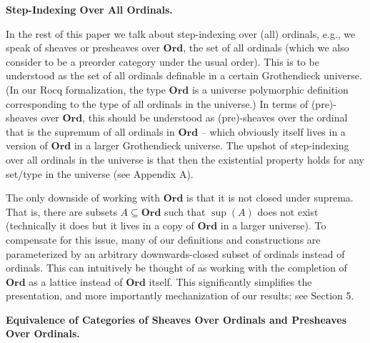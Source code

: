 \documentclass[10pt,a4paper]{article}
\begin{document}
 
 
 
\par\medskip\noindent\textbf{Step-Indexing Over All Ordinals.}\par
 
 
In the rest of this paper we talk about step-indexing over (all) ordinals, e.g., we speak of sheaves or presheaves over $\mathbf{Ord}$, the set of all ordinals (which we also consider to be a preorder category under the usual order). This is to be understood as the set of all ordinals definable in a certain Grothendieck universe. (In our Rocq formalization, the type $\mathbf{Ord}$ is a universe polymorphic definition corresponding to the type of all ordinals in the universe.) In terms of (pre)-sheaves over $\mathbf{Ord}$, this should be understood as (pre)-sheaves over the ordinal that is the supremum of all ordinals in $\mathbf{Ord}$ – which obviously itself lives in a version of $\mathbf{Ord}$ in a larger Grothendieck universe. The upshot of step-indexing over all ordinals in the universe is that then the existential property holds for any set/type in the universe (see Appendix A).\par
 
 
 
The only downside of working with $\mathbf{Ord}$ is that it is not closed under suprema. That is, there are subsets $A\subseteq\mathbf{Ord}$ such that $\sup(A)$ does not exist (technically it does but it lives in a copy of $\mathbf{Ord}$ in a larger universe). To compensate for this issue, many of our definitions and constructions are parameterized by an arbitrary downwards-closed subset of ordinals instead of ordinals. This can intuitively be thought of as working with the completion of $\mathbf{Ord}$ as a lattice instead of $\mathbf{Ord}$ itself. This significantly simplifies the presentation, and more importantly mechanization of our results; see Section 5.\par
 
 
 
 
\par\medskip\noindent\textbf{Equivalence of Categories of Sheaves Over Ordinals and Presheaves Over Ordinals.}\par
 
\end{document}
